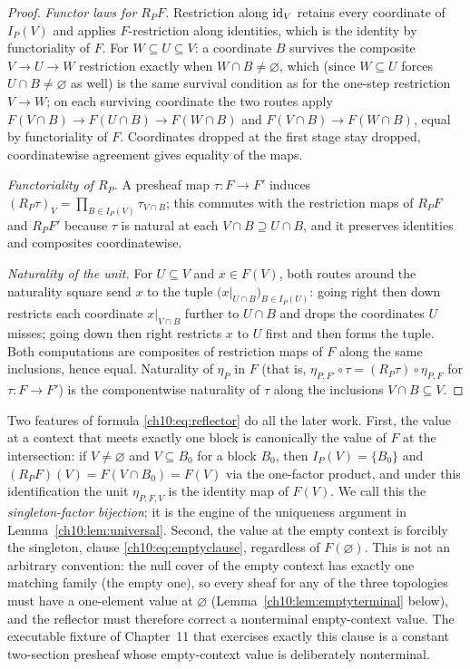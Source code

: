 \begin{proof}
\emph{Functor laws for $R_P F$.} Restriction along $\mathrm{id}_V$ retains every
coordinate of $I_P(V)$ and applies $F$-restriction along identities, which is
the identity by functoriality of $F$. For $W \subseteq U \subseteq V$: a
coordinate $B$ survives the composite $V \to U \to W$ restriction exactly when
$W \cap B \neq \varnothing$, which (since $W \subseteq U$ forces
$U \cap B \neq \varnothing$ as well) is the same survival condition as for the
one-step restriction $V \to W$; on each surviving coordinate the two routes
apply $F(V \cap B) \to F(U \cap B) \to F(W \cap B)$ and
$F(V \cap B) \to F(W \cap B)$, equal by functoriality of $F$. Coordinates
dropped at the first stage stay dropped, coordinatewise agreement gives
equality of the maps.

\emph{Functoriality of $R_P$.} A presheaf map $\tau : F \to F'$ induces
$(R_P \tau)_V = \prod_{B \in I_P(V)} \tau_{V \cap B}$; this commutes with the
restriction maps of $R_P F$ and $R_P F'$ because $\tau$ is natural at each
$V \cap B \supseteq U \cap B$, and it preserves identities and composites
coordinatewise.

\emph{Naturality of the unit.} For $U \subseteq V$ and $x \in F(V)$, both
routes around the naturality square send $x$ to the tuple
$\bigl( x|_{U \cap B} \bigr)_{B \in I_P(U)}$: going right then down restricts
each coordinate $x|_{V \cap B}$ further to $U \cap B$ and drops the
coordinates $U$ misses; going down then right restricts $x$ to $U$ first and
then forms the tuple. Both computations are composites of restriction maps of
$F$ along the same inclusions, hence equal. Naturality of $\eta_P$ in $F$
(that is, $\eta_{P, F'} \circ \tau = (R_P \tau) \circ \eta_{P, F}$ for
$\tau : F \to F'$) is the componentwise naturality of $\tau$ along the
inclusions $V \cap B \subseteq V$.
\end{proof}

\begin{remark}
\label{ch10:rem:structure}
Two features of formula \eqref{ch10:eq:reflector} do all the later work.
First, the value at a context that meets exactly one block is canonically the
value of $F$ at the intersection: if $V \neq \varnothing$ and
$V \subseteq B_0$ for a block $B_0$, then $I_P(V) = \{B_0\}$ and
$(R_P F)(V) = F(V \cap B_0) = F(V)$ via the one-factor product, and under this
identification the unit $\eta_{P, F, V}$ is the identity map of $F(V)$. We
call this the \emph{singleton-factor bijection}; it is the engine of the
uniqueness argument in Lemma~\ref{ch10:lem:universal}. Second, the value at
the empty context is forcibly the singleton, clause
\eqref{ch10:eq:emptyclause}, regardless of $F(\varnothing)$. This is not an
arbitrary convention: the null cover of the empty context has exactly one
matching family (the empty one), so every sheaf for any of the three
topologies must have a one-element value at $\varnothing$
(Lemma~\ref{ch10:lem:emptyterminal} below), and the reflector must therefore
correct a nonterminal empty-context value. The executable fixture of
Chapter~11 that exercises exactly this clause is a constant two-section
presheaf whose empty-context value is deliberately nonterminal.
\end{remark}

